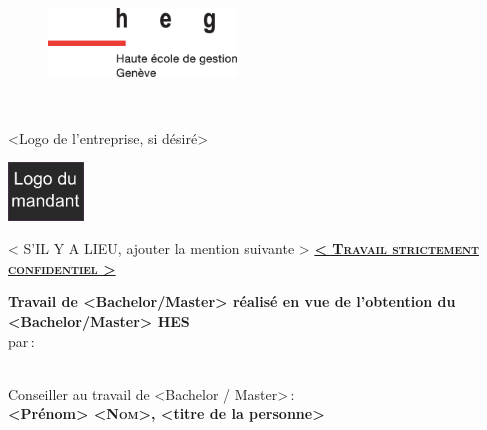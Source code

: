 
\makeatletter	%
	\begin{titlepage}

		\begin{figure}[H]
			\includegraphics[width=5cm]{images/heg-logo.eps}
		\end{figure}
	
		\begin{center}
			
			{\LARGE \textbf{\@title}} \\

			\vspace{1cm}
			
			<Logo de l'entreprise, si désiré>\\	%
			
			\vspace{.2cm}
			
			\includegraphics[width=2cm]{images/logo-mandant.png}
			
			\vspace{1cm}
			\vfill
		
			{\large < S'IL Y A LIEU, ajouter la mention suivante >}
				\textbf{\Large{ \textsc{ \underline{< Travail strictement confidentiel >}}}}\\

			\vspace{2cm}

			\textbf{Travail de <Bachelor/Master> réalisé en vue de l’obtention du <Bachelor/Master> HES}\\
				par\textbf{\,}:\\
				{\large \@author} \\

			\vspace{1cm}
      \vfill

			Conseiller au travail de <Bachelor / Master>\,:\\
				\textbf{\Large{} <Prénom> \textsc{<Nom>}, <titre de la personne>}\\


\end{center}
\end{titlepage}
